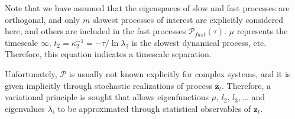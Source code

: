 Note that we have assumed that the eigenspaces of slow and fast processes are orthogonal, and only $m$ slowest processes of interest are explicitly considered here, and others are included in the fast processes $\mathcal{P}_{fast}(\tau)$. $\mu$ represents the timescale $\infty$, $t_2=\kappa_2^{-1}=-\tau/\ln{\lambda_2}$ is the slowest dynamical process, etc. Therefore, this equation indicates a timescale separation.

Unfortunately, $\mathcal{P}$ is usually not known explicitly for complex systems, and it is given implicitly through stochastic realizations of process $\mathbf{z}_t$. Therefore, a variational principle is sought that allows eigenfunctions $\mu,\,l_2,\,l_3,\dots$ and eigenvalues $\lambda_i$ to be approximated through statistical observables of $\mathbf{z}_t$.